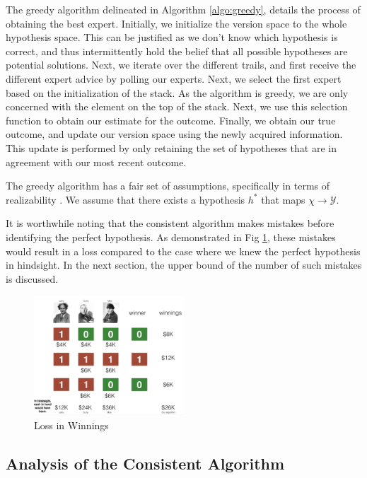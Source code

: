 \documentclass[11pt]{article}
\begin{document}
The greedy algorithm delineated in Algorithm \ref{algo:greedy}, details the process of obtaining the best expert. Initially, we initialize the version space to the whole hypothesis space. This can be justified as we don't know which hypothesis is correct, and thus intermittently hold the belief that all possible hypotheses are potential solutions. Next, we iterate over the different trails, and first receive the different expert advice by polling our experts. Next, we select the first expert based on the initialization of the stack. As the algorithm is greedy, we are only concerned with the element on the top of the stack. Next, we use this selection function to obtain our estimate for the outcome. Finally, we obtain our true outcome, and update our version space using the newly acquired information. This update is performed by only retaining the set of hypotheses that are in agreement with our most recent outcome. 

The greedy algorithm has a fair set of assumptions, specifically in terms of realizability \cite{ohta1984reachability}. We assume that there exists a hypothesis $h^*$ that maps $\chi \to \mathcal{Y}$.

It is worthwhile noting that the consistent algorithm makes mistakes before identifying the perfect hypothesis. As demonstrated in Fig \ref{fig:loss}, these mistakes would result in a loss compared to the case where we knew the perfect hypothesis in hindsight. In the next section, the upper bound of the number of such mistakes is discussed.

\begin{figure}
    \centering
    \includegraphics[width=0.5\textwidth]{fig2.png}
    \caption{Loss in Winnings}
    \label{fig:loss}
\end{figure}



\subsection{Analysis of the Consistent Algorithm}
\end{document}
